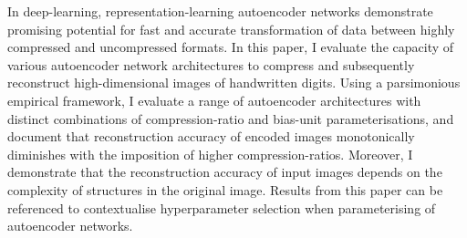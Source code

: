 
\noindent
In deep-learning, representation-learning autoencoder networks demonstrate promising potential for fast and accurate transformation of data between highly compressed and uncompressed formats.
In this paper, I evaluate the capacity of various autoencoder network architectures to compress and subsequently reconstruct high-dimensional images of handwritten digits.
Using a parsimonious empirical framework, I evaluate a range of autoencoder architectures with distinct combinations of compression-ratio and bias-unit parameterisations, and document that reconstruction accuracy of encoded images monotonically diminishes with the imposition of higher compression-ratios.
Moreover, I demonstrate that the reconstruction accuracy of input images depends on the complexity of structures in the original image.
Results from this paper can be referenced to contextualise hyperparameter selection when parameterising of autoencoder networks.